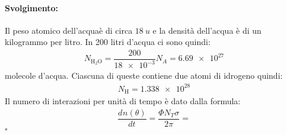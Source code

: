 \documentclass[10pt, a4paper]{article}
\newcommand*\chem[1]{\ensuremath{\mathrm{#1}}}
\theoremstyle{plain}
\newenvironment{svol}{\paragraph{Svolgimento:}}{\hfill$\square$\newline}
\newcommand{\der}[3][]{\ensuremath{\dfrac{d^{#1}#2}{d#3^{#1}}}}
\begin{document}
\begin{svol}
		Il peso atomico dell'acquaè di circa $ \SI{18}{u} $ e la densità dell'acqua è di un kilogrammo per litro. In 200 litri d'acqua ci sono quindi:
		\begin{gather*}
		N_{\chem{H_{2}O}}=\dfrac{200}{\num{18e-3}}N_{A}=\num{6.69e27}
		\end{gather*}
		molecole d'acqua. Ciascuna di queste contiene due atomi di idrogeno quindi:
		\begin{gather*}
		N_{\chem{H}}=\num{1.338e28}		\end{gather*}
		Il numero di interazioni per unità di tempo è dato dalla formula:
		\begin{gather*}
			\der[]{n(\theta)}{t}=\dfrac{\Phi N_{T}\sigma}{2\pi}=
		\end{gather*}
	\end{svol}
\end{document}
